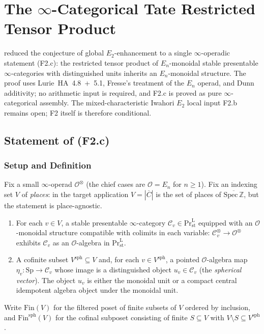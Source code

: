 \chapter{The \(\infty\)-Categorical Tate Restricted Tensor Product}
\label{v4-arith:tate-tensor}

 reduced the conjecture of global
\(E_{2}\)-enhancement to a single \(\infty\)-operadic statement (F2.c):
the restricted tensor product of \(E_{n}\)-monoidal stable presentable
\(\infty\)-categories with distinguished units inherits an
\(E_{n}\)-monoidal structure. The proof uses Lurie~HA~4.8~+~5.1,
Fresse's treatment of the \(E_{n}\) operad, and Dunn additivity; no
arithmetic input is required, and F2.c is proved as pure
\(\infty\)-categorical assembly. The
mixed-characteristic Iwahori \(E_{2}\) local input F2.b remains open;
F2 itself is therefore conditional.

\section{Statement of (F2.c)}
\label{v4-arith:tate:statement}

\subsection{Setup and Definition}

Fix a small \(\infty\)-operad \(\mathcal{O}^{\otimes}\) (the chief cases
are \(\mathcal{O}=E_{n}\) for \(n\geq 1\)). Fix an indexing set \(V\) of
\emph{places}: in the target application \(V=|\overline{C}|\) is the
set of places of \(\overline{\mathrm{Spec}\,\mathbb{Z}}\), but the
statement is place-agnostic.

\begin{setup}[F2.c data]
\label{v4-arith:tate:setup:data}
\leavevmode
\begin{enumerate}
\item[(D1)] For each \(v\in V\), a stable presentable \(\infty\)-category
\(\mathcal{C}_{v}\in\mathrm{Pr}^{\mathrm{L}}_{\mathrm{st}}\) equipped
with an \(\mathcal{O}\)-monoidal structure compatible with colimits in
each variable: \(\mathcal{C}_{v}^{\otimes}\to\mathcal{O}^{\otimes}\)
exhibits \(\mathcal{C}_{v}\) as an \(\mathcal{O}\)-algebra in
\(\mathrm{Pr}^{\mathrm{L}}_{\mathrm{st}}\).
\item[(D2)] A cofinite subset \(V^{\mathrm{sph}}\subseteq V\) and, for
each \(v\in V^{\mathrm{sph}}\), a pointed \(\mathcal{O}\)-algebra map
\(\eta_{v}\colon\mathrm{Sp}\to\mathcal{C}_{v}\) whose image is a
distinguished object \(u_{v}\in\mathcal{C}_{v}\) (the
\emph{spherical vector}). The object \(u_{v}\) is either the monoidal
unit or a compact central idempotent algebra object under the
monoidal unit.
\end{enumerate}
Write \(\mathrm{Fin}(V)\) for the filtered poset of finite subsets of
\(V\) ordered by inclusion, and \(\mathrm{Fin}^{\mathrm{sph}}(V)\) for
the cofinal subposet consisting of finite \(S\subseteq V\) with
\(V\setminus S\subseteq V^{\mathrm{sph}}\).
\end{setup}


